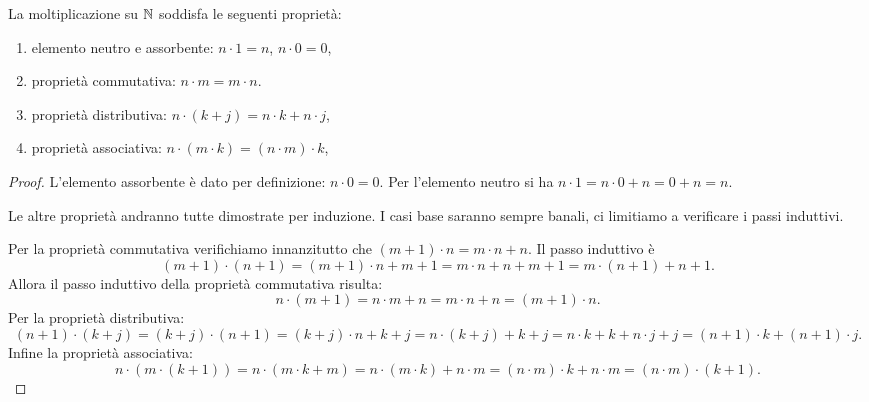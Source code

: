 % 
\begin{theorem}
  \label{th:proprieta_moltiplicazione}%
La moltiplicazione su ${\mathbb N}$ soddisfa le seguenti proprietà:
\begin{enumerate}
  \item elemento neutro e assorbente: $n\cdot 1=n$, $n\cdot 0=0$,
  \item proprietà commutativa: $n\cdot m = m\cdot n$.
  \item proprietà distributiva: $n\cdot(k+j) = n\cdot k + n\cdot j$,
  \item proprietà associativa: $n\cdot(m\cdot k) = (n\cdot m)\cdot k$,
\end{enumerate}
\end{theorem}
\begin{proof}
  L'elemento assorbente è dato per definizione: $n\cdot 0 = 0$.
  Per l'elemento neutro si ha $n\cdot 1 = n\cdot 0 + n = 0+n=n$.

  Le altre proprietà andranno tutte dimostrate 
  per induzione. 
  I casi base saranno sempre banali, ci limitiamo a verificare 
  i passi induttivi. 

  Per la proprietà commutativa verifichiamo innanzitutto che 
  $(m+1)\cdot n = m\cdot n + n$. 
  Il passo induttivo è
  \[
  (m+1)\cdot(n+1) 
  = (m+1)\cdot n + m + 1  
  = m\cdot n + n + m + 1
  = m\cdot (n+1) + n + 1. 
  \]
  Allora il passo induttivo della proprietà commutativa risulta:
  \[
  n\cdot (m+1) 
  = n\cdot m + n 
  = m \cdot n + n 
  = (m+1)\cdot n.  
  \]
  Per la proprietà distributiva:
  \[
  (n+1)\cdot(k+j) 
  = (k+j)\cdot (n+1)  
  = (k+j)\cdot n + k + j
  = n\cdot(k+j) + k + j
  = n\cdot k +k + n\cdot j + j
  = (n+1)\cdot k + (n+1)\cdot j.
  \]
  Infine la proprietà associativa:
  \[
  n\cdot(m\cdot(k+1))
  = n\cdot (m\cdot k + m) 
  = n\cdot (m\cdot k) + n\cdot m
  = (n\cdot m)\cdot k + n\cdot m
  = (n\cdot m)\cdot (k+1). 
  \]
\end{proof}

% 

